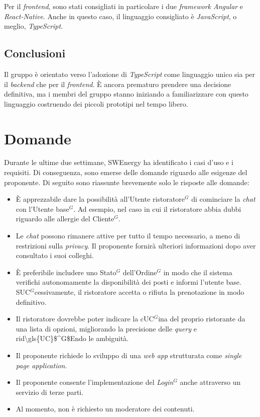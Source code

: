 Per il \textit{frontend}, sono stati consigliati in particolare i due
\textit{framework Angular} e \textit{React-Native}. Anche in questo caso, il
linguaggio consigliato è \textit{JavaScript}, o meglio, \textit{TypeScript}.

\subsection{Conclusioni}

Il gruppo è orientato verso l'adozione di \textit{TypeScript} come linguaggio
unico sia per il \textit{backend} che per il \textit{frontend}. È ancora 
prematuro prendere una decisione definitiva, ma i membri del gruppo
stanno iniziando a familiarizzare con questo linguaggio costruendo dei
piccoli prototipi nel tempo libero.

\section{Domande}

Durante le ultime due settimane, SWEnergy ha identificato i casi d'uso e i
requisiti. Di conseguenza, sono emerse delle domande riguardo alle esigenze
del proponente. Di seguito sono riassunte brevemente solo le risposte alle
domande:

\begin{itemize}
	\item È apprezzabile dare la possibilità all'\gls{Utente ristoratore}$^G$ di
	      cominciare la \textit{chat} con l'\gls{Utente base}$^G$. Ad esempio, nel caso in cui il
	      ristoratore abbia dubbi riguardo alle allergie del \gls{Cliente}$^G$.

	\item Le \textit{chat} possono rimanere attive per tutto il tempo necessario, a meno
	      di restrizioni sulla \textit{privacy}. Il proponente fornirà ulteriori
	      informazioni dopo aver consultato i suoi colleghi.

	\item È preferibile includere uno \gls{Stato}$^G$ dell'\gls{Ordine}$^G$ in modo che il sistema
	      verifichi autonomamente la disponibilità dei posti e informi l'utente
	      base. S\gls{UC}$^G$cessivamente, il ristoratore accetta o rifiuta la
	      prenotazione in modo definitivo.

	\item Il ristoratore dovrebbe poter indicare la c\gls{UC}$^G$ina del proprio
	      ristorante da una lista di opzioni, migliorando la precisione delle
	      \textit{query} e rid\gls{\gls{UC}$^G$E}ndo le ambiguità.

	\item Il proponente richiede lo sviluppo di una \textit{web app}
	      strutturata come \textit{single page application}.

	\item Il proponente consente l'implementazione del \textit{\gls{Login}$^G$} anche
	      attraverso un servizio di terze parti.

	\item Al momento, non è richiesto un moderatore dei contenuti.
\end{itemize}

